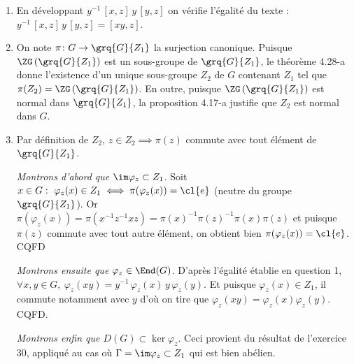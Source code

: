 
\begin{enumerate}
    \item En développant $y^{-1}\,[x,z]\,y\,[y,z]$ on vérifie l'égalité du texte : $y^{-1}\,[x,z]\,y\,[y,z] = [xy,z]$.
    \item On note $\pi\colon G\to \grq{G}{Z_1}$ la surjection canonique. Puisque $\ZG\left(\grq{G}{Z_1}\right)$ est un sous-groupe de $\grq{G}{Z_1}$, le théorème 4.28-a
    donne l'existence d'un unique sous-groupe $Z_2$ de $G$ contenant $Z_1$ tel que $\pi(Z_2) = \ZG\left(\grq{G}{Z_1}\right)$. En outre, puisque $\ZG\left(\grq{G}{Z_1}\right)$ est 
    normal dans $\grq{G}{Z_1}$, la proposition 4.17-a justifie que $Z_2$ est normal dans $G$.
    \item Par définition de $Z_2$, $z\in Z_2 \implies \pi(z)$ commute avec tout élément de $\grq{G}{Z_1}$. 
    
    \emph{Montrons d'abord que $\im \varphi_z \subset Z_1$}. Soit $x\in G :~ \varphi_z(x) \in Z_1 \iff \pi(\varphi_z(x)) = \cl{e}$ (neutre du groupe $\grq{G}{Z_1}$). Or 
    $\pi(\varphi_z(x)) = \pi(x^{-1}z^{-1}xz) = \pi(x)^{-1}\pi(z)^{-1}\pi(x)\pi(z)$ et puisque $\pi(z)$ commute avec tout autre élément, on obtient bien $\pi(\varphi_z(x)) = \cl{e}$. CQFD

    \emph{Montrons ensuite que $\varphi_z \in \End(G)$}. D'après l'égalité établie en question 1, $\forall x,y \in G,~ \varphi_z(xy) = y^{-1}\,\varphi_z(x)\,y\,\varphi_z(y)$. 
    Et puisque $\varphi_z(x) \in Z_1$, il commute notamment avec $y$ d'où on tire que $\varphi_z(xy) = \varphi_z(x)\varphi_z(y)$. CQFD.

    \emph{Montrons enfin que $D(G) \subset \ker \varphi_z $}. Ceci provient du résultat de l'exercice 30, appliqué au cas où $\Gamma = \im \varphi_z \subset Z_1$ qui est bien abélien.

\end{enumerate}
